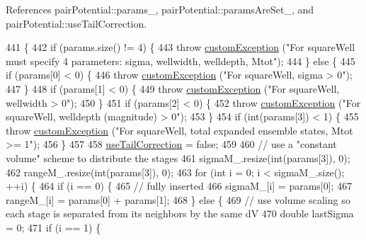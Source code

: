References pair\-Potential\-::params\-\_\-, pair\-Potential\-::params\-Are\-Set\-\_\-, and pair\-Potential\-::use\-Tail\-Correction.


\begin{DoxyCode}
441                                                                  \{
442     \textcolor{keywordflow}{if} (params.size() != 4) \{
443         \textcolor{keywordflow}{throw} \hyperlink{classcustom_exception}{customException} (\textcolor{stringliteral}{"For squareWell must specify 4 parameters: sigma, wellwidth,
       welldepth, Mtot"});
444     \} \textcolor{keywordflow}{else} \{
445         \textcolor{keywordflow}{if} (params[0] < 0) \{
446             \textcolor{keywordflow}{throw} \hyperlink{classcustom_exception}{customException} (\textcolor{stringliteral}{"For squareWell, sigma > 0"});
447         \}
448         \textcolor{keywordflow}{if} (params[1] < 0) \{
449             \textcolor{keywordflow}{throw} \hyperlink{classcustom_exception}{customException} (\textcolor{stringliteral}{"For squareWell, wellwidth > 0"});
450         \}
451         \textcolor{keywordflow}{if} (params[2] < 0) \{
452             \textcolor{keywordflow}{throw} \hyperlink{classcustom_exception}{customException} (\textcolor{stringliteral}{"For squareWell, welldepth (magnitude) > 0"});
453         \}
454         \textcolor{keywordflow}{if} (\textcolor{keywordtype}{int}(params[3]) < 1) \{
455             \textcolor{keywordflow}{throw} \hyperlink{classcustom_exception}{customException} (\textcolor{stringliteral}{"For squareWell, total expanded ensemble states, Mtot >=
       1"});
456         \}
457 
458         \hyperlink{classpair_potential_ab4b4538a7e13771f50a29aaac2443037}{useTailCorrection} = \textcolor{keyword}{false};
459 
460         \textcolor{comment}{// use a "constant volume" scheme to distribute the stages}
461         sigmaM\_.resize(\textcolor{keywordtype}{int}(params[3]), 0);
462         rangeM\_.resize(\textcolor{keywordtype}{int}(params[3]), 0);
463         \textcolor{keywordflow}{for} (\textcolor{keywordtype}{int} i = 0; i < sigmaM\_.size(); ++i) \{
464             \textcolor{keywordflow}{if} (i == 0) \{
465                 \textcolor{comment}{// fully inserted}
466                 sigmaM\_[i] = params[0];
467                 rangeM\_[i] = params[0] + params[1];
468             \} \textcolor{keywordflow}{else} \{
469                 \textcolor{comment}{// use volume scaling so each stage is separated from its neighbors by the same dV}
470                 \textcolor{keywordtype}{double} lastSigma = 0;
471                 \textcolor{keywordflow}{if} (i == 1) \{

\end{DoxyCode}

